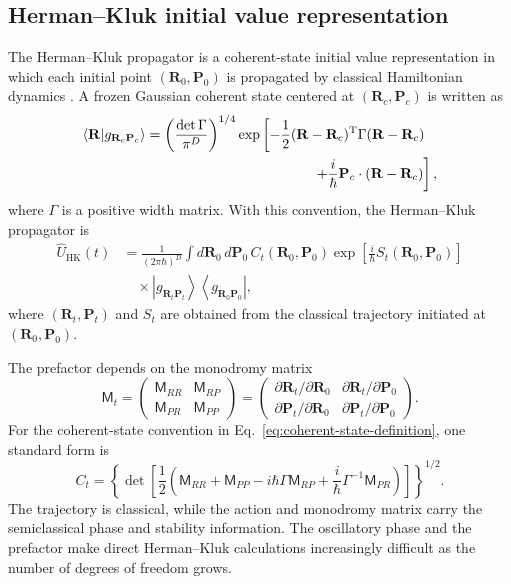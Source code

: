 \documentclass[
  11pt,
  letterpaper,
  onehalfspacing,
  normalmargins,
  equalmargins,
  oneside
]{ut-thesis}
\begin{document}
\subsection{Herman--Kluk initial value representation}
\label{subsec:herman-kluk-ivr}

The Herman--Kluk propagator is a coherent-state initial value representation
in which each initial point \((\mathbf R_0,\mathbf P_0)\) is propagated by
classical Hamiltonian dynamics \cite{HermanKluk1984,Miller2001}. A frozen
Gaussian coherent state centered at \((\mathbf R_c,\mathbf P_c)\) is written
as
\begin{align}
\left\langle
\mathbf R
\middle|
g_{\mathbf R_c\mathbf P_c}
\right\rangle
&=
\left(
\frac{\det\Gamma}{\pi^D}
\right)^{1/4}
\exp\left[
-
\frac{1}{2}
(\mathbf R-\mathbf R_c)^{\mathrm T}
\Gamma
(\mathbf R-\mathbf R_c)
\right.
\nonumber\\
&\hspace{4.2cm}
\left.
+
\frac{i}{\hbar}
\mathbf P_c\cdot(\mathbf R-\mathbf R_c)
\right],
\label{eq:coherent-state-definition}
\end{align}
where \(\Gamma\) is a positive width matrix. With this convention, the
Herman--Kluk propagator is
\begin{align}
\hat U_{\mathrm{HK}}(t)
&=
\frac{1}{(2\pi\hbar)^D}
\int d\mathbf R_0\,d\mathbf P_0\,
C_t(\mathbf R_0,\mathbf P_0)
\exp\left[
\frac{i}{\hbar}S_t(\mathbf R_0,\mathbf P_0)
\right]
\nonumber\\
&\quad\times
\left|
g_{\mathbf R_t\mathbf P_t}
\right\rangle
\left\langle
g_{\mathbf R_0\mathbf P_0}
\right|,
\label{eq:herman-kluk-propagator}
\end{align}
where \((\mathbf R_t,\mathbf P_t)\) and \(S_t\) are obtained from the
classical trajectory initiated at \((\mathbf R_0,\mathbf P_0)\).

The prefactor depends on the monodromy matrix
\begin{equation}
\mathsf M_t
=
\begin{pmatrix}
\mathsf M_{RR} & \mathsf M_{RP}\\
\mathsf M_{PR} & \mathsf M_{PP}
\end{pmatrix}
=
\begin{pmatrix}
\partial\mathbf R_t/\partial\mathbf R_0
&
\partial\mathbf R_t/\partial\mathbf P_0
\\
\partial\mathbf P_t/\partial\mathbf R_0
&
\partial\mathbf P_t/\partial\mathbf P_0
\end{pmatrix}.
\label{eq:monodromy-matrix-hk}
\end{equation}
For the coherent-state convention in
Eq.~\eqref{eq:coherent-state-definition}, one standard form is
\begin{equation}
C_t
=
\left\{
\det\left[
\frac{1}{2}
\left(
\mathsf M_{RR}
+
\mathsf M_{PP}
-
i\hbar\Gamma\mathsf M_{RP}
+
\frac{i}{\hbar}\Gamma^{-1}\mathsf M_{PR}
\right)
\right]
\right\}^{1/2}.
\label{eq:hk-prefactor}
\end{equation}
The trajectory is classical, while the action and monodromy matrix carry the
semiclassical phase and stability information. The oscillatory phase and the
prefactor make direct Herman--Kluk calculations increasingly difficult as the
number of degrees of freedom grows.
\end{document}
